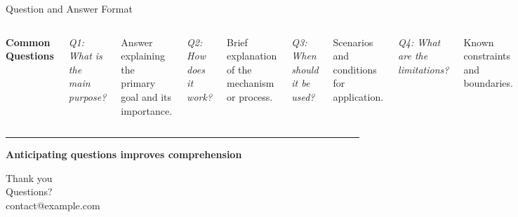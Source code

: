 \documentclass[8pt,aspectratio=169]{beamer}
\newcommand{\bottomnote}[1]{%
\vfill
\vspace{-2mm}
\textcolor{mllavender2}{\rule{\textwidth}{0.4pt}}
\vspace{1mm}
\footnotesize
\textbf{#1}
}
\begin{document}
\begin{frame}[t]{Question and Answer Format}
\begin{columns}[T]
\textbf{Common Questions}

\textit{Q1: What is the main purpose?}

Answer explaining the primary goal and its importance.

\vspace{0.5em}
\textit{Q2: How does it work?}

Brief explanation of the mechanism or process.

\textit{Q3: When should it be used?}

Scenarios and conditions for application.

\vspace{0.5em}
\textit{Q4: What are the limitations?}

Known constraints and boundaries.
\end{columns}

\vspace{0.5em}
\begin{center}
\framebox[0.5\textwidth][c]{
\vspace{1.5cm}
\textcolor{midgray}{[FAQ Diagram/Icon]}
\vspace{1.5cm}
}
\end{center}

\bottomnote{Anticipating questions improves comprehension}
\end{frame}

\begin{frame}[plain]
\vspace{3cm}
\begin{center}
{\Large Thank you}\\[2cm]
{\normalsize Questions?}\\[1cm]
{\small contact@example.com}
\end{center}
\end{frame}
\end{document}
